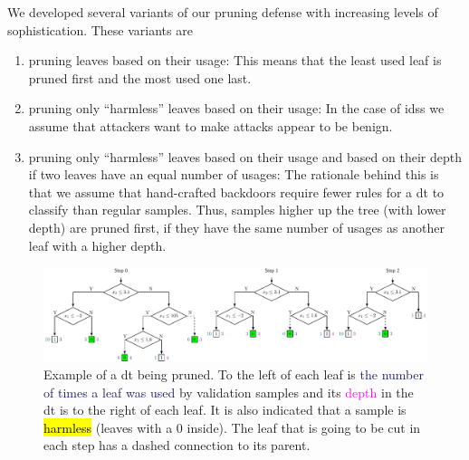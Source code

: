 \documentclass[10pt,sigconf,letterpaper,dvipsnames]{acmart}
\begin{document}
We developed several variants of our pruning defense with increasing levels of sophistication. These variants are
\begin{enumerate}[wide, labelwidth=!, labelindent=0pt]
\item pruning leaves based on their usage: This means that the least used leaf is pruned first and the most used one last.
\item pruning only ``harmless'' leaves based on their usage: In the case of \glspl{ids} we assume that attackers want to make attacks appear to be benign.
\item pruning only ``harmless'' leaves based on their usage and based on their depth if two leaves have an equal number of usages: The rationale behind this is that we assume that hand-crafted backdoors require fewer rules for a \gls{dt} to classify than regular samples. Thus, samples higher up the tree (with lower depth) are pruned first, if they have the same number of usages as another leaf with a higher depth.
\end{enumerate}
\begin{figure}[h]
\includegraphics[width=\textwidth]{pruning_example.pdf}
\caption{Example of a \gls{dt} being pruned. To the left of each leaf is \textcolor{MidnightBlue}{the number of times a leaf was used} by validation samples and its \textcolor{Fuchsia}{depth} in the \gls{dt} is to the right of each leaf. It is also indicated that a sample is \protect{} \hl{harmless} (leaves with a 0 inside). The leaf that is going to be cut in each step has a dashed connection to its parent.}
\label{fig:pruningExample}
\end{figure}
\end{document}
